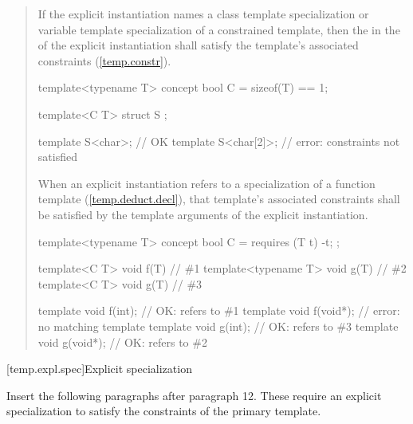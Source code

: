 \begin{quote}
\setcounter{Paras}{13}
\pnum
If the explicit instantiation names a class template specialization
or variable template specialization of a constrained template, then
the  in the
 of the explicit
instantiation shall satisfy the template's associated constraints
(\ref{temp.constr}).
\enterexample
\begin{codeblock}
template<typename T> concept bool C = sizeof(T) == 1;

template<C T> struct S { };

template S<char>;    // OK
template S<char[2]>; // error: constraints not satisfied
\end{codeblock}
\exitexample

\pnum
When an explicit instantiation refers to a specialization of a
function template (\ref{temp.deduct.decl}), that 
template's associated constraints shall be satisfied by the template 
arguments of the explicit instantiation.
% 
\enterexample
\begin{codeblock}
template<typename T> concept bool C = requires (T t) { -t; };

template<C T>        void f(T) { } // \#1
template<typename T> void g(T) { } // \#2
template<C T>        void g(T) { } // \#3

template void f(int);   // OK: refers to \#1
template void f(void*); // error: no matching template
template void g(int);   // OK: refers to \#3
template void g(void*); // OK: refers to \#2\end{codeblock}
\exitexample
\end{quote}


[temp.expl.spec]{Explicit specialization}


Insert the following paragraphs after paragraph 12. These require
an explicit specialization to satisfy the constraints of the primary
template.

